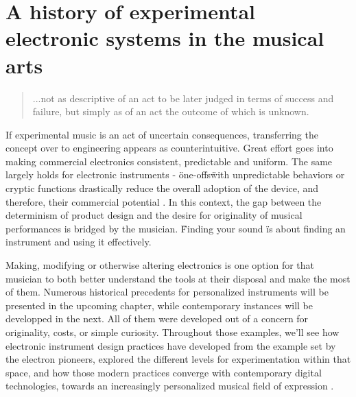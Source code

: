 \chapter{A history of experimental electronic systems in the musical arts}\label{background}
\begin{quote}
	
	...not as descriptive of an act to be later judged in terms of success and failure, but simply as of an act the outcome of which is unknown. 
	
	\cite[p.13]{cage1961}
	
	\end{quote}
	
If experimental music is an act of uncertain consequences, transferring the concept over to engineering appears as counterintuitive. Great effort goes into making commercial electronics consistent, predictable and uniform. The same largely holds for electronic instruments - \"one-offs\" with unpredictable behaviors or cryptic functions drastically reduce the overall adoption of the device, and therefore, their commercial potential \cite[p.5]{haslett2005}. In this context, the gap between the determinism of product design and the desire for originality of musical performances is bridged by the musician. \"Finding your sound \" is about finding an instrument and using it effectively.  

Making, modifying or otherwise altering electronics is one option for that musician to both better understand the tools at their disposal and make the most of them. Numerous historical precedents for personalized instruments will be presented in the upcoming chapter, while contemporary instances will be developped in the next. All of them were developed out of a concern for originality, costs, or simple curiosity. Throughout those examples, we'll see how electronic instrument design practices have developed from the example set by the electron pioneers, explored the different levels for experimentation within that space, and how those modern practices converge with contemporary digital technologies, towards an increasingly personalized musical field of expression \cite{hermans2014}.

